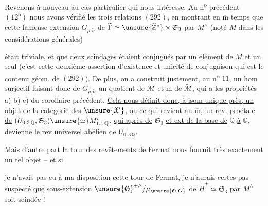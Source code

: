Revenons à nouveau au cas particulier qui nous intéresse. Au n\textsuperscript{o} précédent $(12^{\mathrm o})$ nous avons vérifié les trois relations $(292)$, en montrant en $\overline{\mathrm m}$ temps que cette fameuse extension $G_{\rho,\widetilde\sigma}$ de $\widetilde\Gamma\simeq\unsure{\widehat{\mathbb Z}^{*}}\times\mathfrak S_3$ par $M^{\wedge}$ (noté $M$ dans les considérations générales)




était triviale, et que deux scindages étaient conjugués par un élément de $M$ et un seul (c'est cette deuxième assertion d'existence et unicité de conjugaison qui est le contenu géom. de $(292)$).
De plus, on a  construit justement, au n\textsuperscript{o} $11$, un hom surjectif
faisant donc de $G_{\rho,\widetilde\sigma}$ un quotient de $\mathcal M$ et $\overline{\mathrm m}$ de $\widetilde{\mathcal M}$, qui a les propriétés a) b) c) du corollaire précédent. \uline{Cela nous définit donc, à isom unique près, un objet de la catégorie des} $\unsure{\mathfrak X'}$,
\uline{ou ce qui revient au $\overline{\mathrm m}$, un rev. proétale de} $(U_{0,3\,\mathbb Q},\mathfrak S_3)\unsure{\simeq}M'_{1,1\,\mathbb Q}$,
\uline{qui après   de} $\mathfrak S_3$ \uline{et ext de la base de} $\mathbb Q$ \uline{à} $\overline{\mathbb Q}$, \uline{devienne le rev universel abélien de} $U_{0,3\,\overline{\mathbb Q}}$.

Mais d'autre part la tour des revêtements de Fermat nous fournit très exactement un tel objet -- et si




je n'avais pas eu à ma disposition cette tour de Fermat, je n'aurais certes pas suspecté que  sous-extension $\unsure{\mathfrak G}^{+\wedge}/\mu_{\unsure{\mathfrak G|G}}$  de $\widetilde H^+\simeq\mathfrak S_3$ par $M^{\wedge}$ soit scindée !

